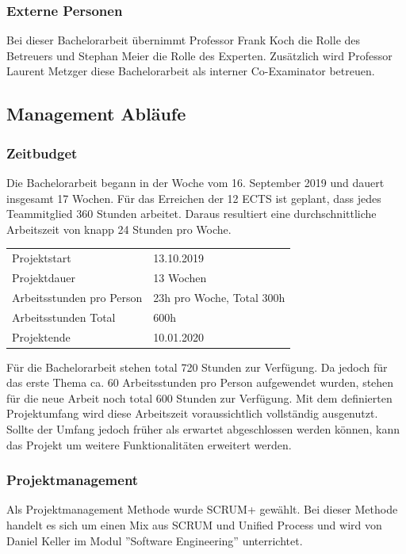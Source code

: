 \subsubsection*{Externe Personen}
Bei dieser Bachelorarbeit übernimmt Professor Frank Koch die Rolle des Betreuers und Stephan Meier die Rolle des Experten. Zusätzlich wird Professor Laurent Metzger diese Bachelorarbeit als interner Co-Examinator betreuen.

\newpage
\subsection{Management Abläufe}
\subsubsection*{Zeitbudget}
Die Bachelorarbeit begann in der Woche vom  16. September 2019 und dauert insgesamt 17 Wochen. Für das Erreichen der 12 ECTS ist geplant, dass jedes Teammitglied 360 Stunden arbeitet. Daraus resultiert eine durchschnittliche Arbeitszeit von knapp 24 Stunden pro Woche.

\begin{table}[H]
	\centering
	\begin{tabu} to 0.9\textwidth {l X}
	\toprule
	Projektstart & 13.10.2019 \\
	Projektdauer & 13 Wochen \\
	Arbeitsstunden pro Person & 23h pro Woche, Total 300h \\
	Arbeitsstunden Total & 600h \\
	Projektende & 10.01.2020 \\ 
	\bottomrule
	\end{tabu}
\end{table}


\noindent Für die Bachelorarbeit stehen total 720 Stunden zur Verfügung. Da jedoch für das erste Thema ca. 60 Arbeitsstunden pro Person aufgewendet wurden, stehen für die neue Arbeit noch total 600 Stunden zur Verfügung. Mit dem definierten Projektumfang wird diese Arbeitszeit voraussichtlich vollständig ausgenutzt. Sollte der Umfang jedoch früher als erwartet abgeschlossen werden können, kann das Projekt um weitere Funktionalitäten erweitert werden.

\subsubsection*{Projektmanagement}
Als Projektmanagement Methode wurde SCRUM+ gewählt. Bei dieser Methode handelt es sich um einen Mix aus SCRUM und Unified Process und wird von Daniel Keller im Modul ''Software Engineering'' unterrichtet.


